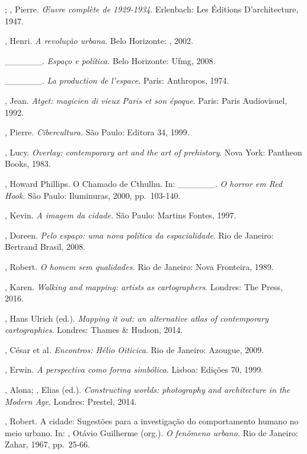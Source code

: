 \begin{Parskip}
; , Pierre. \emph{\OE uvre complète de 1929-1934}.
Erlenbach: Les Éditions D'architecture, 1947.

, Henri. \emph{A revolução urbana.} Belo Horizonte: ,
2002.

\_\_\_\_\_\_. \emph{Espaço e política.} Belo Horizonte: Ufmg, 2008.

\_\_\_\_\_\_. \emph{La production de l'espace.} Paris: Anthropos, 1974.

, Jean. \emph{Atget: magicien di vieux Paris et son époque}.
Paris: Paris Audiovisuel, 1992.

, Pierre. \emph{Cibercultura.} São Paulo: Editora 34, 1999.

, Lucy. \emph{Overlay: contemporary art and the art of
prehistory}. Nova York: Pantheon Books, 1983.

, Howard Phillips. O Chamado de Cthulhu. In: \_\_\_\_\_\_. \emph{O horror em Red Hook}. São Paulo: Iluminuras, 2000, pp.~103-140.

, Kevin. \emph{A imagem da cidade.} São Paulo: Martins Fontes,
1997.

, Doreen. \emph{Pelo espaço: uma nova política da
espacialidade}. Rio de Janeiro: Bertrand Brasil, 2008.

, Robert. \emph{O homem sem qualidades.} Rio de Janeiro: Nova
Fronteira, 1989.

, Karen. \emph{Walking and mapping: artists as cartographers}.
Londres: The  Press, 2016.

, Hans Ulrich (ed.). \emph{Mapping it out: an alternative atlas
of contemporary cartographies}. Londres: Thames \& Hudson, 2014.

, César et al. \emph{Encontros: Hélio Oiticica}. Rio de
Janeiro: Azougue, 2009.

, Erwin. \emph{A perspectiva como forma simbólica.} Lisboa:
Edições 70, 1999.

, Alona; , Elias (ed.). \emph{Constructing worlds:
photography and architecture in the Modern Age}. Londres: Prestel, 2014.

, Robert. A cidade: Sugestões para a investigação do comportamento
humano no meio urbano. In: , Otávio Guilherme (org.). \emph{O
fenômeno urbano.} Rio de Janeiro: Zahar, 1967, pp.~25-66.


\end{Parskip}
